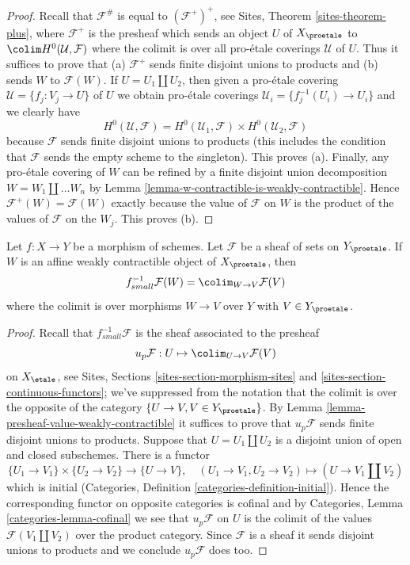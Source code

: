 \begin{proof}
Recall that $\mathcal{F}^\#$ is equal to $(\mathcal{F}^+)^+$, see
Sites, Theorem \ref{sites-theorem-plus}, where $\mathcal{F}^+$
is the presheaf which sends an object $U$ of $X_\proetale$ to
$\colim H^0(\mathcal{U}, \mathcal{F})$ where the colimit is
over all pro-\'etale coverings $\mathcal{U}$ of $U$.
Thus it suffices to prove that (a) $\mathcal{F}^+$ sends finite
disjoint unions to products and (b) sends $W$ to $\mathcal{F}(W)$.
If $U = U_1 \amalg U_2$, then given a pro-\'etale covering
$\mathcal{U} = \{f_j : V_j \to U\}$ of $U$ we obtain pro-\'etale coverings
$\mathcal{U}_i = \{f_j^{-1}(U_i) \to U_i\}$ and we clearly have
$$
H^0(\mathcal{U}, \mathcal{F}) =
H^0(\mathcal{U}_1, \mathcal{F}) \times
H^0(\mathcal{U}_2, \mathcal{F})
$$
because $\mathcal{F}$ sends finite disjoint unions to products (this includes
the condition that $\mathcal{F}$ sends the empty scheme to the singleton).
This proves (a).
Finally, any pro-\'etale covering of $W$ can be refined by a finite disjoint
union decomposition $W = W_1 \amalg \ldots W_n$ by
Lemma \ref{lemma-w-contractible-is-weakly-contractible}.
Hence $\mathcal{F}^+(W) = \mathcal{F}(W)$ exactly because the value of
$\mathcal{F}$ on $W$ is the product of the values of $\mathcal{F}$
on the $W_j$. This proves (b).
\end{proof}

\begin{lemma}
\label{lemma-small-pullback-weakly-contractible}
Let $f : X \to Y$ be a morphism of schemes. Let $\mathcal{F}$ be a sheaf
of sets on $Y_\proetale$. If $W$ is an affine weakly contractible
object of $X_\proetale$, then
$$
f_{small}^{-1}\mathcal{F}(W) = \colim_{W \to V} \mathcal{F}(V)
$$
where the colimit is over morphisms $W \to V$ over $Y$
with $V \in Y_\proetale$.
\end{lemma}

\begin{proof}
Recall that $f_{small}^{-1}\mathcal{F}$ is the sheaf associated to the
presheaf
$$
u_p\mathcal{F} : U \mapsto \colim_{U \to V} \mathcal{F}(V)
$$
on $X_\etale$, see Sites, Sections \ref{sites-section-morphism-sites} and
\ref{sites-section-continuous-functors}; we've suppressed from the notation
that the colimit is over the opposite of the category
$\{U \to V, V \in Y_\proetale\}$. By
Lemma \ref{lemma-presheaf-value-weakly-contractible}
it suffices to prove that $u_p\mathcal{F}$ sends finite disjoint unions
to products.
Suppose that $U = U_1 \amalg U_2$ is a disjoint union of open and closed
subschemes. There is a functor
$$
\{U_1 \to V_1\} \times \{U_2 \to V_2\} \longrightarrow
\{U \to V\},\quad
(U_1 \to V_1, U_2 \to V_2) \longmapsto (U \to V_1 \amalg V_2)
$$
which is initial (Categories, Definition \ref{categories-definition-initial}).
Hence the corresponding functor on opposite categories is cofinal and
by Categories, Lemma \ref{categories-lemma-cofinal} we see
that $u_p\mathcal{F}$ on $U$ is the colimit of the values
$\mathcal{F}(V_1 \amalg V_2)$ over the product category.
Since $\mathcal{F}$ is a sheaf it sends disjoint unions to products and
we conclude $u_p\mathcal{F}$ does too.
\end{proof}

